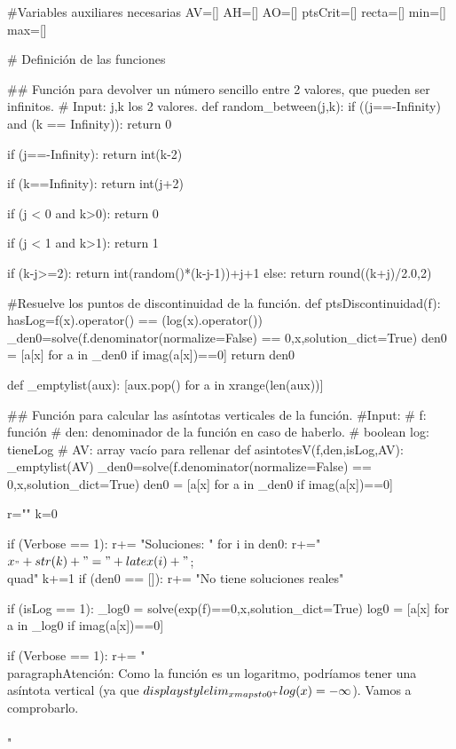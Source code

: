 \begin{sagesilent}

#Variables auxiliares necesarias
AV=[]
AH=[]
AO=[]
ptsCrit=[]
recta=[]
min=[]
max=[]

# Definición de las funciones

## Función para devolver un número sencillo entre 2 valores, que pueden ser infinitos.
# Input: j,k los 2 valores.
def random_between(j,k):
 if ((j==-Infinity) and (k == Infinity)):
  return 0

 if (j==-Infinity):
  return int(k-2)

 if (k==Infinity):
  return int(j+2)

 if (j < 0 and k>0):
  return 0

 if (j < 1 and k>1):
  return 1


 if (k-j>=2):
  return int(random()*(k-j-1))+j+1
 else:
  return round((k+j)/2.0,2)

#Resuelve los puntos de discontinuidad de la función.
def ptsDiscontinuidad(f):
    hasLog=f(x).operator() == (log(x).operator())
    _den0=solve(f.denominator(normalize=False) == 0,x,solution_dict=True)
    den0 = [a[x] for a in _den0 if imag(a[x])==0]
    return den0

def _emptylist(aux):
    [aux.pop() for a in xrange(len(aux))]
    
## Función para calcular las asíntotas verticales de la función.
#Input:
# f: función
# den: denominador de la función en caso de haberlo.
# boolean log: tieneLog 
# AV: array vacío para rellenar
def asintotesV(f,den,isLog,AV):
    _emptylist(AV)
    _den0=solve(f.denominator(normalize=False) == 0,x,solution_dict=True)
    den0 = [a[x] for a in _den0 if imag(a[x])==0]

    r=""
    k=0

    if (Verbose == 1):
        r+= "Soluciones: "
        for i in den0:
            r+="$x_"+str(k)+"="+latex(i)+" $;\\quad"
            k+=1
        if (den0 == []):
            r+= "No tiene soluciones reales"

    if (isLog == 1):
        _log0 = solve(exp(f)==0,x,solution_dict=True)
        log0 = [a[x] for a in _log0 if imag(a[x])==0]  

        if (Verbose == 1):
            r+= "\\paragraph{Atención: } Como la función es un logaritmo, podríamos tener una asíntota vertical (ya que $\\displaystyle\\lim_{x\\mapsto 0^+} \\log(x) = -\infty$). Vamos a comprobarlo.\\\\"


\end{sagesilent}
